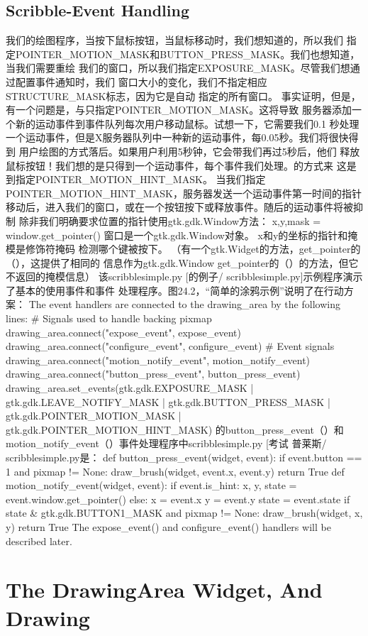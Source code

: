 	\subsection{Scribble-Event Handling}
我们的绘图程序，当按下鼠标按钮，当鼠标移动时，我们想知道的，所以我们
指定POINTER_MOTION_MASK和BUTTON_PRESS_MASK。我们也想知道，当我们需要重绘
我们的窗口，所以我们指定EXPOSURE_MASK。尽管我们想通过配置事件通知时，我们
窗口大小的变化，我们不指定相应STRUCTURE_MASK标志，因为它是自动
指定的所有窗口。
事实证明，但是，有一个问题是，与只指定POINTER_MOTION_MASK。这将导致
服务器添加一个新的运动事件到事件队列每次用户移动鼠标。试想一下，它需要我们0.1
秒处理一个运动事件，但是X服务器队列中一种新的运动事件，每0.05秒。我们将很快得到
用户绘图的方式落后。如果用户利用5秒钟，它会带我们再过5秒后，他们
释放鼠标按钮！我们想的是只得到一个运动事件，每个事件我们处理。的方式来
这是到指定POINTER_MOTION_HINT_MASK。
当我们指定POINTER_MOTION_HINT_MASK，服务器发送一个运动事件第一时间的指针
移动后，进入我们的窗口，或在一个按钮按下或释放事件。随后的运动事件将被抑制
除非我们明确要求位置的指针使用gtk.gdk.Window方法：
x,y,mask = window.get_pointer()
窗口是一个gtk.gdk.Window对象。 x和y的坐标的指针和掩模是修饰符掩码
检测哪个键被按下。 （有一个gtk.Widget的方法，get_pointer的（），这提供了相同的
信息作为gtk.gdk.Window get_pointer的（）的方法，但它不返回的掩模信息）
该scribblesimple.py [的例子/ sc​​ribblesimple.py]示例程序演示了基本的使用事件和事件
处理程序。图24.2，“简单的涂鸦示例”说明了在行动方案：
The event handlers are connected to the drawing_area by the following lines:
# Signals used to handle backing pixmap
drawing_area.connect("expose_event", expose_event)
drawing_area.connect("configure_event", configure_event)
# Event signals
drawing_area.connect("motion_notify_event", motion_notify_event)
drawing_area.connect("button_press_event", button_press_event)
drawing_area.set_events(gtk.gdk.EXPOSURE_MASK
| gtk.gdk.LEAVE_NOTIFY_MASK
| gtk.gdk.BUTTON_PRESS_MASK
| gtk.gdk.POINTER_MOTION_MASK
| gtk.gdk.POINTER_MOTION_HINT_MASK)
的button_press_event（）和motion_notify_event（）事件处理程序中scribblesimple.py [考试
	普莱斯/ scribblesimple.py是：
def button_press_event(widget, event):
if event.button == 1 and pixmap != None:
draw_brush(widget, event.x, event.y)
return True
def motion_notify_event(widget, event):
if event.is_hint:
x, y, state = event.window.get_pointer()
else:
x = event.x
y = event.y
state = event.state
if state & gtk.gdk.BUTTON1_MASK and pixmap != None:
draw_brush(widget, x, y)
return True
The expose_event() and configure_event() handlers will be described later.

\section{The DrawingArea Widget, And Drawing}
